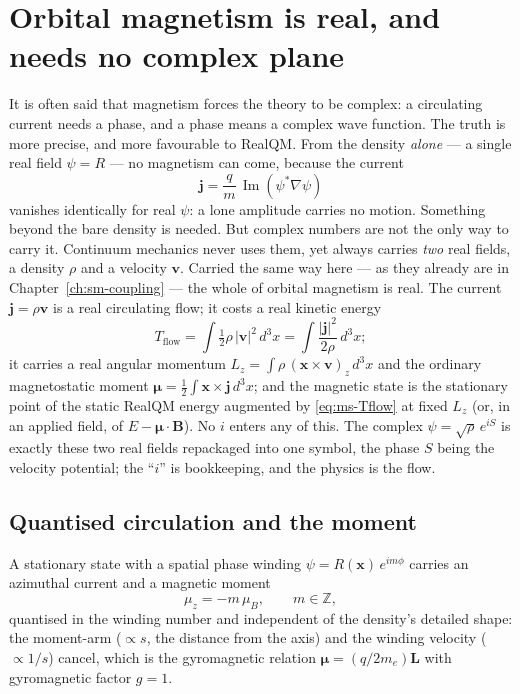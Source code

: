 \section{Orbital magnetism is real, and needs no complex plane}\label{sec:orbital-magnetism}

It is often said that magnetism forces the theory to be complex: a circulating current needs a phase, and a phase
means a complex wave function. The truth is more precise, and more favourable to RealQM. From the density
\emph{alone} --- a single real field $\psi = R$ --- no magnetism can come, because the current
\[
\mathbf{j} = \frac{q}{m}\,\operatorname{Im}(\psi^* \nabla\psi)
\]
vanishes identically for real $\psi$: a lone amplitude carries no motion. Something beyond the bare density is
needed. But complex numbers are not the only way to carry it. Continuum mechanics never uses them, yet always
carries \emph{two} real fields, a density $\rho$ and a velocity $\mathbf{v}$. Carried the same way here --- as
they already are in Chapter~\ref{ch:sm-coupling} --- the whole of orbital magnetism is real. The current
$\mathbf{j} = \rho\mathbf{v}$ is a real circulating flow; it costs a real kinetic energy
\begin{equation}
T_{\text{flow}} = \int \tfrac{1}{2}\rho\,|\mathbf{v}|^2 \, d^3x = \int \frac{|\mathbf{j}|^2}{2\rho}\, d^3x ;
\label{eq:ms-Tflow}
\end{equation}
it carries a real angular momentum $L_z = \int \rho\,(\mathbf{x}\times\mathbf{v})_z\, d^3x$ and the ordinary
magnetostatic moment $\boldsymbol{\mu} = \tfrac{1}{2}\int \mathbf{x}\times\mathbf{j}\, d^3x$; and the magnetic
state is the stationary point of the static RealQM energy augmented by \eqref{eq:ms-Tflow} at fixed $L_z$ (or, in
an applied field, of $E - \boldsymbol{\mu}\cdot\mathbf{B}$). No $i$ enters any of this. The complex
$\psi = \sqrt{\rho}\,e^{iS}$ is exactly these two real fields repackaged into one symbol, the phase $S$ being the
velocity potential; the ``$i$'' is bookkeeping, and the physics is the flow.

\subsection*{Quantised circulation and the moment}

A stationary state with a spatial phase winding $\psi = R(\mathbf{x})\,e^{im\phi}$ carries an azimuthal current
and a magnetic moment
\begin{equation}
\mu_z = -m\,\mu_B, \qquad m \in \mathbb{Z},
\label{eq:ms-mu}
\end{equation}
quantised in the winding number and independent of the density's detailed shape: the moment-arm ($\propto s$, the
distance from the axis) and the winding velocity ($\propto 1/s$) cancel, which is the gyromagnetic relation
$\boldsymbol{\mu} = (q/2m_e)\mathbf{L}$ with gyromagnetic factor $g = 1$.

